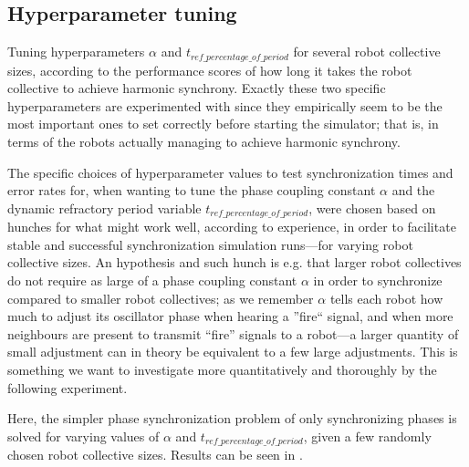 	
	\subsection{Hyperparameter tuning}
	Tuning hyperparameters $\alpha$ and $t_{ref\_percentage\_of\_period}$ for several robot collective sizes, according to the performance scores of how long it takes the robot collective to achieve harmonic synchrony. Exactly these two specific hyperparameters are experimented with since they empirically seem to be the most important ones to set correctly before starting the simulator; that is, in terms of the robots actually managing to achieve harmonic synchrony.
	
	The specific choices of hyperparameter values to test synchronization times and error rates for, when wanting to tune the phase coupling constant $\alpha$ and the dynamic refractory period variable $t_{ref\_percentage\_of\_period}$, were chosen based on hunches for what might work well, according to experience, in order to facilitate stable and successful synchronization simulation runs—for varying robot collective sizes. An hypothesis and such hunch is e.g. that larger robot collectives do not require as large of a phase coupling constant $\alpha$ in order to synchronize compared to smaller robot collectives; as we remember $\alpha$ tells each robot how much to adjust its oscillator phase when hearing a ''fire`` signal, and when more neighbours are present to transmit ``fire'' signals to a robot—a larger quantity of small adjustment can in theory be equivalent to a few large adjustments. This is something we want to investigate more quantitatively and thoroughly by the following experiment.
	
	Here, the simpler phase synchronization problem of only synchronizing phases is solved for varying values of $\alpha$ and $t_{ref\_percentage\_of\_period}$, given a few randomly chosen robot collective sizes. Results can be seen in .
	
	
